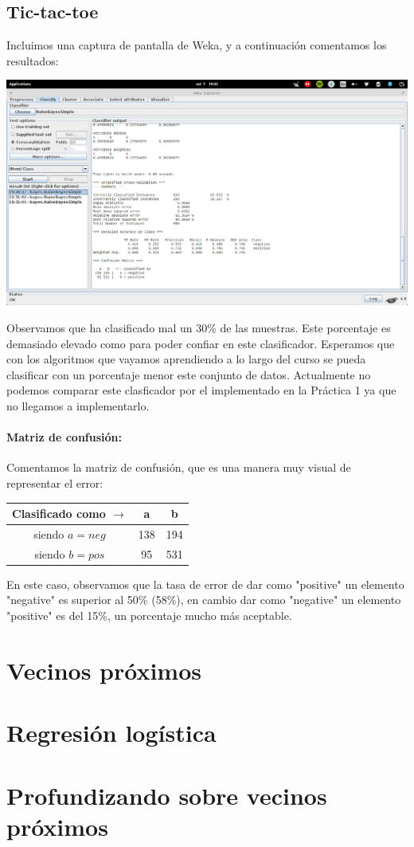 \documentclass[nochap]{apuntes}
\begin{document}
\subsection{Tic-tac-toe}

Incluimos una captura de pantalla de Weka, y a continuación comentamos los resultados:

\begin{center}
\includegraphics[scale=0.3]{img/Tic-tac-toe_NBSimple.png}
\end{center}

Observamos que ha clasificado mal un 30\% de las muestras. Este porcentaje es demasiado elevado como para poder confiar en este clasificador. Esperamos que con los algoritmos que vayamos aprendiendo a lo largo del curso se pueda clasificar con un porcentaje menor este conjunto de datos. Actualmente no podemos comparar este clasficador por el implementado en la Práctica 1 ya que no llegamos a implementarlo.  

\paragraph{Matriz de confusión:} Comentamos la matriz de confusión, que es una manera muy visual de representar el error:

\begin{center}
\begin{tabular}{c|cc}
Clasificado como $\to$ & a & b \\\hline
siendo $a = neg$ & 138 & 194 \\
siendo $b = pos$ & 95 & 531
\end{tabular}
\end{center}
En este caso, observamos que la tasa de error de dar como "positive" un elemento "negative" es superior al 50\% (58\%), en cambio dar como "negative" un elemento "positive" es del 15\%, un porcentaje mucho más aceptable.

\section{Vecinos próximos}


\section{Regresión logística}


\section{Profundizando sobre vecinos próximos}
\end{document}
